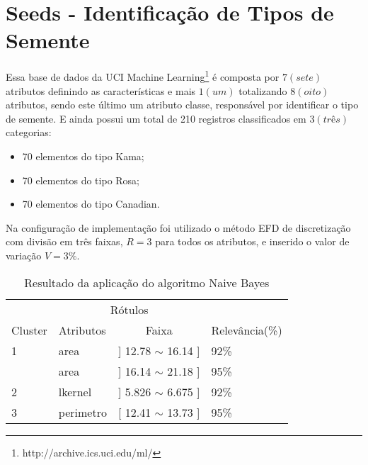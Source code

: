 \section{Seeds - Identificação de Tipos de Semente}
Essa base de dados da UCI Machine Learning\footnote{http://archive.ics.uci.edu/ml/} é composta por ${7(sete)}$ atributos definindo as características e mais ${1(um)}$ totalizando ${8(oito)}$ atributos, sendo este último um atributo classe, responsável por identificar o tipo de semente. E ainda possui um total de 210 registros classificados em ${3(três)}$ categorias:
\begin{itemize}[noitemsep]
 \item 70 elementos do tipo Kama;
 \item 70 elementos do tipo Rosa;
 \item 70 elementos do tipo Canadian.
\end{itemize}
Na configuração de implementação foi utilizado o método EFD de discretização com divisão em três faixas, ${R=3}$ para todos os atributos, e inserido o valor de variação ${V=3\%}$.


\begin{table}[!h]
\centering
\caption{Resultado da aplicação do algoritmo Naive Bayes}
\label{tab:rot:seeds:nb}
\begin{tabular}{llrl}
\hline \hline
\multicolumn{1}{c}{\cellcolor[HTML]{FFFFFF}} & \multicolumn{2}{c}{Rótulos}                      & \multicolumn{1}{r}{}            \\ \cline{2-3}
Cluster                                      & Atributos      & \multicolumn{1}{c}{Faixa}       & \multicolumn{1}{c}{Relevância(\%)} \\ \hline \hline
1                                            & area           & ] 12.78 $\sim$  16.14 ]           &    92\%                         \\  \hline
                                             & area           & ] 16.14 $\sim$  21.18 ]           &    95\%                       \\ 
\multirow{-2}{*}{2}                          & lkernel        & ] 5.826 $\sim$  6.675 ]           &    92\%                      \\  \hline
3                                            & perimetro      & [ 12.41 $\sim$  13.73 ]           &    95\%                       \\ \hline \hline
\end{tabular}
\end{table}

